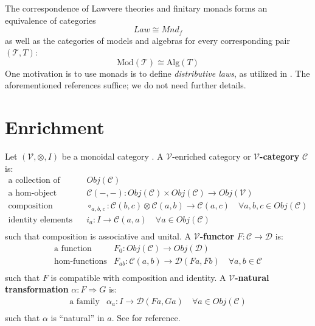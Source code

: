 \documentclass[a4paper,UKenglish]{article}
\theoremstyle{definition}
\newcommand{\Mod}{\mathrm{Mod}}
\newcommand{\Alg}{\mathrm{Alg}}
\newcommand{\V}{\mathscr{V}}
\newcommand{\C}{\mathscr{C}}
\newcommand{\D}{\mathscr{D}}
\newcommand{\T}{\mathscr{T}}
\begin{document}
The correspondence of Lawvere theories and finitary monads forms an equivalence of categories $$Law \cong Mnd_f$$ as well as the categories of models and algebras for every corresponding pair $(\T, T)$: $$\Mod(\T) \cong \Alg(T)$$ One motivation is to use monads is to define \textit{distributive laws}, as utilized in \cite{ladl}. The aforementioned references suffice; we do not need further details. 

\section{Enrichment}

Let $(\V,\otimes,I)$ be a monoidal category \cite{maclane}. A $\V$-enriched category or \textbf{$\V$-category} $\C$ is:
\[\begin{array}{rl}
\text{a collection of objects} & Obj(\C)\\
\text{a hom-object function} & \C(-,-):Obj(\C) \times Obj(\C) \to Obj(\V)\\
\text{composition morphisms} & \circ_{a,b,c}:\C(b,c) \otimes \C(a,b) \to \C(a,c) \quad \forall a,b,c \in Obj(\C)\\
\text{identity elements} & i_a:I\to\C(a,a) \quad \forall a \in Obj(\C)\\
\end{array}\]
such that composition is associative and unital. A \textbf{$\V$-functor} $F:\C \to \D$ is:
\[\begin{array}{rl}
\text{a function} & F_0: Obj(\C) \to Obj(\D)\\
\text{hom-functions} & F_{ab}: \C(a,b) \to \D(Fa,Fb) \quad \forall a,b \in \C\\
\end{array}\]
such that $F$ is compatible with composition and identity. A \textbf{$\V$-natural transformation} $\alpha: F \Rightarrow G$ is:
\[\begin{array}{rl}
\text{a family} & \alpha_a: I \to \D(Fa,Ga) \quad \forall a \in Obj(\C)\\
\end{array}\]
such that $\alpha$ is ``natural'' in $a$. See \cite{enrich} for reference.
\end{document}
